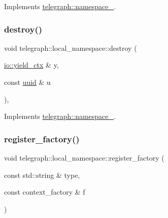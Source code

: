 Implements \hyperlink{classtelegraph_1_1namespace___ab7a20d98f18494d8e11aada783221dd5}{telegraph\+::namespace\+\_\+}.

\mbox{\label{classtelegraph_1_1local__namespace_aae3c0b770ea3bd29b1e4dfac7cfd805f}} 
\subsubsection{\texorpdfstring{destroy()}{destroy()}}
{\footnotesize\ttfamily void telegraph\+::local\+\_\+namespace\+::destroy (\begin{DoxyParamCaption}\item[{\hyperlink{structboost_1_1asio_1_1yield__ctx}{io\+::yield\+\_\+ctx} \&}]{y,  }\item[{const \hyperlink{namespacetelegraph_a51ee91d7eaeef067f7ccac2b170e5d59}{uuid} \&}]{u }\end{DoxyParamCaption})\hspace{0.3cm}{\ttfamily [override]}, {\ttfamily [virtual]}}



Implements \hyperlink{classtelegraph_1_1namespace___ad077446ed8ad4b099ddc050067e14f9d}{telegraph\+::namespace\+\_\+}.

\mbox{\label{classtelegraph_1_1local__namespace_a5b322511c2e72c889bcb7ffb5d271d26}} 
\subsubsection{\texorpdfstring{register\+\_\+factory()}{register\_factory()}}
{\footnotesize\ttfamily void telegraph\+::local\+\_\+namespace\+::register\+\_\+factory (\begin{DoxyParamCaption}\item[{const std\+::string \&}]{type,  }\item[{const context\+\_\+factory \&}]{f }\end{DoxyParamCaption})\hspace{0.3cm}{\ttfamily [inline]}}



